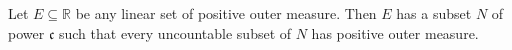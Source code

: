 Let $E \subseteq \mathbb{R}$ be any linear set of positive outer measure. Then $E$ has a subset $N$ of power $\mathfrak{c}$ such that every uncountable subset of $N$ has positive outer measure.
